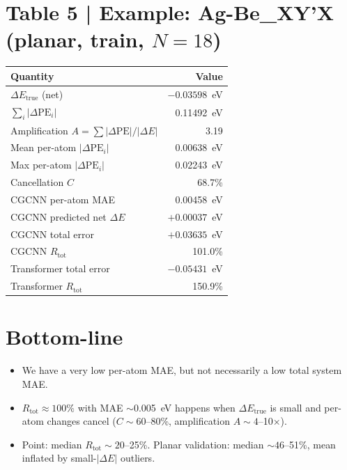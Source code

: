 \documentclass[11pt,a4paper]{article}
\begin{document}
\section*{Table 5 | Example: Ag-Be\_XY'X (planar, train, $N=18$)}

\begin{center}
\small
\begin{tabular}{lr}
  \toprule
  Quantity & Value \\
  \midrule
  $\Delta E_{\mathrm{true}}$ (net) & $-0.03598$~eV \\
  $\sum_i|\Delta\mathrm{PE}_i|$ & 0.11492~eV \\
  Amplification $A=\sum|\Delta\mathrm{PE}|/|\Delta E|$ & 3.19 \\
  Mean per-atom $|\Delta\mathrm{PE}_i|$ & 0.00638~eV \\
  Max per-atom $|\Delta\mathrm{PE}_i|$ & 0.02243~eV \\
  Cancellation $C$ & 68.7\% \\
  CGCNN per-atom MAE & 0.00458~eV \\
  CGCNN predicted net $\Delta E$ & $+0.00037$~eV \\
  CGCNN total error & $+0.03635$~eV \\
  CGCNN $R_{\mathrm{tot}}$ & 101.0\% \\
  Transformer total error & $-0.05431$~eV \\
  Transformer $R_{\mathrm{tot}}$ & 150.9\% \\
  \bottomrule
\end{tabular}
\end{center}

\section*{Bottom-line}

\begin{itemize}
  \item We have a very low per-atom MAE, but not necessarily a low total system MAE. 
  \item $R_{\mathrm{tot}}\approx 100\%$ with MAE $\sim$0.005~eV happens when $\Delta E_{\mathrm{true}}$ is small and per-atom changes cancel ($C\sim 60$--80\%, amplification $A\sim 4$--10$\times$).
  \item Point: median $R_{\mathrm{tot}}\sim 20$--25\%. Planar validation: median $\sim 46$--51\%, mean inflated by small-$|\Delta E|$ outliers.
\end{itemize}
\end{document}
